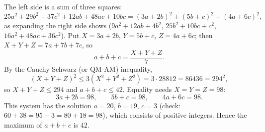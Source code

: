 The left side is a sum of three squares:
\[
25a^2+29b^2+37c^2+12ab+48ac+10bc=(3a+2b)^2+(5b+c)^2+(4a+6c)^2 ,
\]
as expanding the right side shows ($9a^2+12ab+4b^2$, $25b^2+10bc+c^2$, $16a^2+48ac+36c^2$). Put $X=3a+2b$, $Y=5b+c$, $Z=4a+6c$; then $X+Y+Z=7a+7b+7c$, so
\[
a+b+c=\dfrac{X+Y+Z}{7}.
\]
By the Cauchy-Schwarz (or QM-AM) inequality,
\[
(X+Y+Z)^2\le3(X^2+Y^2+Z^2)=3\cdot28812=86436=294^2,
\]
so $X+Y+Z\le294$ and $a+b+c\le42$. Equality needs $X=Y=Z=98$:
\[
3a+2b=98,\qquad 5b+c=98,\qquad 4a+6c=98 .
\]
This system has the solution $a=20$, $b=19$, $c=3$ (check: $60+38=95+3=80+18=98$), which consists of positive integers. Hence the maximum of $a+b+c$ is $\boxed{42}$.
